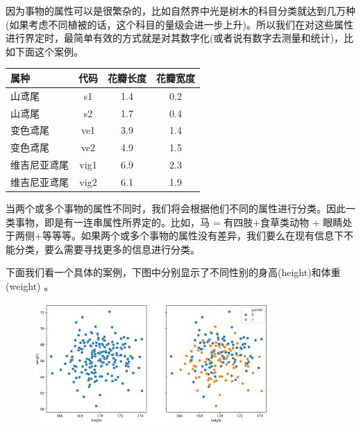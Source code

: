 \documentclass[12pt]{article}
\numberwithin{figure}{section}
\numberwithin{equation}{section}
\begin{document}
因为事物的属性可以是很繁杂的，比如自然界中光是树木的科目分类就达到几万种(如果考虑不同植被的话，这个科目的量级会进一步上升)。所以我们在对这些属性进行界定时，最简单有效的方式就是对其数字化(或者说有数字去测量和统计)，比如下面这个案例。
\begin{table}[H]
		\centering
		\begin{tabular}{lccc}
		\hline 
			属种 & 代码 &花瓣长度 & 花瓣宽度 \\
			\hline 
			山鸢尾 & s1 & 1.4 & 0.2 \\
			山鸢尾 & s2 & 1.7 & 0.4 \\
			变色鸢尾 & ve1 & 3.9  & 1.4 \\
			变色鸢尾 & ve2& 4.9 & 1.5 \\
			维吉尼亚鸢尾 & vig1 & 6.9 & 2.3  \\
			维吉尼亚鸢尾 & vig2 & 6.1 & 1.9 \\
			\hline  
		\end{tabular}
\end{table}

\begin{lemma}
	当两个或多个事物的属性不同时，我们将会根据他们不同的属性进行分类。因此一类事物，即是有一连串属性所界定的。比如，马 = 有四肢+食草类动物 + 眼睛处于两侧+等等等。如果两个或多个事物的属性没有差异，我们要么在现有信息下不能分类，要么需要寻找更多的信息进行分类。
\end{lemma}

\begin{example}
下面我们看一个具体的案例，下图中分别显示了不同性别的身高(height)和体重(weight)	。
\begin{figure}[H]
	\centering
	\includegraphics[width=0.8\textwidth]{fig/C2C2BMI}
\end{figure}
\end{example}
\end{document}
